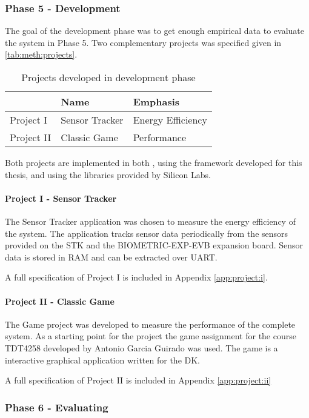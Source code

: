 \subsubsection{Phase 5 - Development}

The goal of the development phase was to get enough empirical data to evaluate the system in Phase 5.
Two complementary projects was specified given in \autoref{tab:meth:projects}.

\begin{table}[H]
  \begin{tabular}{|l|l|l|}
    \hline
    & Name & Emphasis \\
    \hline
    \hline
    Project I & Sensor Tracker & Energy Efficiency \\
    \hline
    Project II & Classic Game & Performance \\
    \hline
  \end{tabular}
  \caption{Projects developed in development phase}
  \label{tab:meth:projects}
\end{table}

Both projects are implemented in both {\rust}, using the framework developed for this thesis, and {\C} using the libraries provided by Silicon Labs.

\paragraph{Project I - Sensor Tracker}
The Sensor Tracker application was chosen to measure the energy efficiency of the system.
The application tracks sensor data periodically from the sensors provided on the STK and the BIOMETRIC-EXP-EVB expansion board.
Sensor data is stored in RAM and can be extracted over UART.

A full specification of Project I is included in Appendix \autoref{app:project:i}.

\paragraph{Project II - Classic Game}
The Game project was developed to measure the performance of the complete system.
As a starting point for the project the game assignment for the course TDT4258 developed by Antonio Garcia Guirado was used.
The game is a interactive graphical application written for the DK.

A full specification of Project II is included in Appendix \autoref{app:project:ii}

\subsubsection{Phase 6 - Evaluating}
